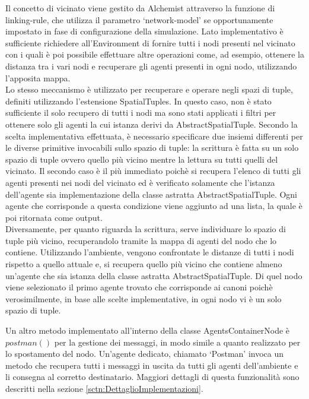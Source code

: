 Il concetto di vicinato viene gestito da Alchemist attraverso la funzione di linking-rule, che utilizza il parametro `network-model' se opportunamente impostato in fase di configurazione della simulazione. Lato implementativo è sufficiente richiedere all'Environment di fornire tutti i nodi presenti nel vicinato con i quali è poi possibile effettuare altre operazioni come, ad esempio, ottenere la distanza tra i vari nodi e recuperare gli agenti presenti in ogni nodo, utilizzando l'apposita mappa.
\\
Lo stesso meccanismo è utilizzato per recuperare e operare negli spazi di tuple, definiti utilizzando l'estensione SpatialTuples. In questo caso, non è stato sufficiente il solo recupero di tutti i nodi ma sono stati applicati i filtri per ottenere solo gli agenti la cui istanza derivi da AbstractSpatialTuple.
Secondo la scelta implementativa effettuata, è necessario specificare due insiemi differenti per le diverse primitive invocabili sullo spazio di tuple: la scrittura è fatta su un solo spazio di tuple ovvero quello più vicino mentre la lettura su tutti quelli del vicinato.
Il secondo caso è il più immediato poichè si recupera l'elenco di tutti gli agenti presenti nei nodi del vicinato ed è verificato solamente che l'istanza dell'agente sia implementazione della classe astratta AbstractSpatialTuple. Ogni agente che corrisponde a questa condizione viene aggiunto ad una lista, la quale è poi ritornata come output.
\\
Diversamente, per quanto riguarda la scrittura, serve individuare lo spazio di tuple più vicino, recuperandolo tramite la mappa di agenti del nodo che lo contiene. Utilizzando l'ambiente, vengono confrontate le distanze di tutti i nodi rispetto a quello attuale e, si recupera quello più vicino che contiene almeno un'agente che sia istanza della classe astratta AbstractSpatialTuple. Di quel nodo viene selezionato il primo agente trovato che corrisponde ai canoni poichè verosimilmente, in base alle scelte implementative, in ogni nodo vi è un solo spazio di tuple.

Un altro metodo implementato all'interno della classe AgentsContainerNode è $postman()$ per la gestione dei messaggi, in modo simile a quanto realizzato per lo spostamento del nodo. Un'agente dedicato, chiamato `Postman' invoca un metodo che recupera tutti i messaggi in uscita da tutti gli agenti dell'ambiente e li consegna al corretto destinatario. Maggiori dettagli di questa funzionalità sono descritti nella sezione \ref{sctn:DettaglioImplementazioni}.

